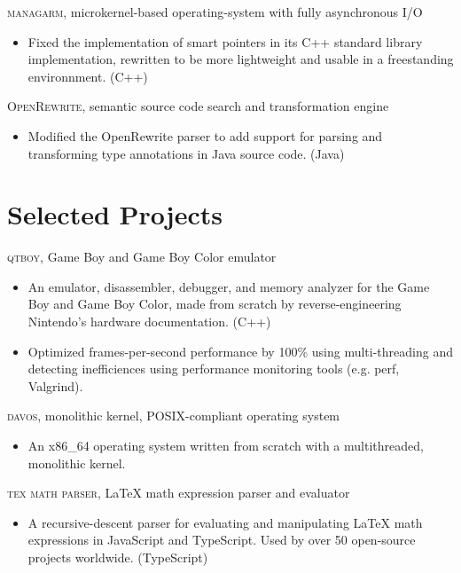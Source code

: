 \documentclass[11pt]{article} %
\begin{document}
\textsc{managarm}, microkernel-based operating-system with fully asynchronous I/O
\begin{itemize}
	\item Fixed the implementation of smart pointers in its \textsc{C++} standard library implementation, rewritten to be more lightweight and usable in a freestanding environnment. (C++)
\end{itemize}

\textsc{OpenRewrite}, semantic source code search and transformation engine
\begin{itemize}
	\item Modified the OpenRewrite parser to add support for parsing and transforming type annotations in Java source code. (Java)
\end{itemize}

\section*{Selected Projects}

\textsc{qtboy}, Game Boy and Game Boy Color emulator
\begin{itemize}
	\item An emulator, disassembler, debugger, and memory analyzer for the Game Boy and Game Boy Color, made from scratch by reverse-engineering Nintendo's hardware documentation. (C++)
	\item Optimized frames-per-second performance by 100\% using multi-threading and detecting inefficiences using performance monitoring tools (e.g. perf, Valgrind).
\end{itemize}

\textsc{davos}, monolithic kernel, POSIX-compliant operating system
\begin{itemize}
	\item An x86\_64 operating system written from scratch with a multithreaded, monolithic kernel.
\end{itemize}

\textsc{tex math parser}, \LaTeX{} math expression parser and evaluator
\begin{itemize}
	\item A recursive-descent parser for evaluating and manipulating \LaTeX{} math expressions in JavaScript and TypeScript. Used by over 50 open-source projects worldwide. (TypeScript)
\end{itemize}
\end{document}
